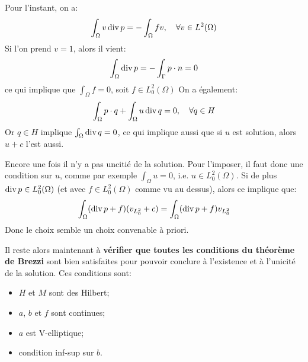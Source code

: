 \medskip
Pour l'instant, on a:
\begin{equation}\displaystyle\int_\Omega v \operatorname{div} p = -\displaystyle\int_\Omega fv,\quad\forall v\in L^2(\Omega)\end{equation}
Si l'on prend $v=1$, alors il vient:
\begin{equation}\displaystyle\int_\Omega \operatorname{div} p = -\displaystyle\int_\Gamma p\cdot n =0
\end{equation}
ce qui
implique que $\int_\Omega f=0$, soit $f\in L^2_0(\Omega)$
\medskip
On a également:
\begin{equation}\int_\Omega p\cdot q + \displaystyle\int_\Omega u \operatorname{div} q =0,\quad\forall q\in H\end{equation}
Or $q\in H$ implique $\int_\Omega \operatorname{div} q =0$, ce qui implique aussi que si $u$ est solution, alors
$u+c$ l'est aussi.

Encore une fois il n'y a pas uncitié de la solution. Pour l'imposer, il faut donc une condition sur $u$, comme
par exemple $\int_\Omega u=0$, i.e. $u\in L^2_0(\Omega)$.
Si de plus $\operatorname{div} p\in L^2_0(\Omega)$ (et avec $f\in L^2_0(\Omega)$ comme vu au dessus), alors ce
implique que:
\begin{equation}\displaystyle\int_\Omega (\operatorname{div} p + f)(v_{L^2_0}+c) = \displaystyle\int_\Omega (\operatorname{div} p+f) v_{L^2_0}\end{equation}
\medskip
Donc le choix  semble un choix convenable à priori.

\medskip
Il reste alors maintenant à \textbf{vérifier que toutes les conditions du théorème de Brezzi}
sont bien satisfaites pour pouvoir conclure à l'existence et à l'unicité de la solution.
Ces conditions sont:
\begin{itemize}
   \item $H$ et $M$ sont des Hilbert;
   \item $a$, $b$ et $f$ sont continues;
   \item $a$ est V-elliptique;
   \item condition inf-sup sur $b$.
\end{itemize}

